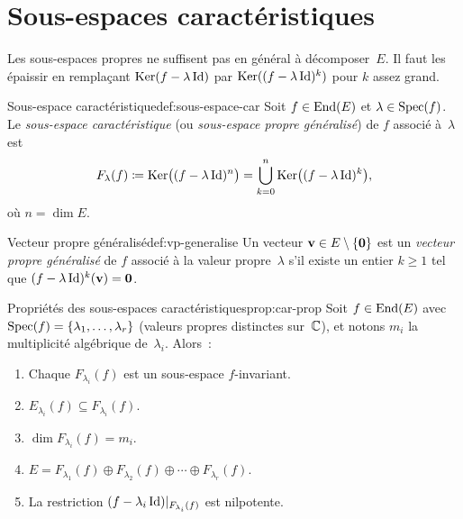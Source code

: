 \section{Sous-espaces caractéristiques}\label{sec:sous-espaces-car}

Les sous-espaces propres ne suffisent pas en général à décomposer~$E$.
Il faut les \og{}épaissir\fg{} en remplaçant $\operatorname{Ker}(f-\lambda\operatorname{Id})$ par
$\operatorname{Ker}((f-\lambda\operatorname{Id})^k)$ pour $k$ assez grand.

\begin{definition}{Sous-espace caractéristique}{def:sous-espace-car}
  Soit $f\in\operatorname{End}(E)$ et $\lambda\in\operatorname{Spec}(f)$. Le \emph{sous-espace
  caractéristique} (ou \emph{sous-espace
  propre généralisé}) de $f$
  associé à~$\lambda$ est
  \[
    F_\lambda(f)\coloneqq\operatorname{Ker}\bigl((f-\lambda\operatorname{Id})^n\bigr)
    =\bigcup_{k=0}^{n}\operatorname{Ker}\bigl((f-\lambda\operatorname{Id})^k\bigr),
  \]
  où $n=\dim E$.
\end{definition}

\begin{definition}{Vecteur propre généralisé}{def:vp-generalise}
  Un vecteur $\mathbf{v}\in E\setminus\left\{\mathbf{0}\right\}$ est un \emph{vecteur
  propre généralisé} de $f$ associé à la
  valeur propre~$\lambda$ s'il existe un entier $k\geq 1$ tel que
  $(f-\lambda\operatorname{Id})^k(\mathbf{v})=\mathbf{0}$.
\end{definition}

\begin{proposition}{Propriétés des sous-espaces caractéristiques}{prop:car-prop}
  Soit $f\in\operatorname{End}(E)$ avec $\operatorname{Spec}(f)=\left\{\lambda_1,\ldots,\lambda_r\right\}$
  (valeurs propres distinctes sur~${\mathbb{C}}$), et notons $m_i$ la multiplicité
  algébrique de~$\lambda_i$. Alors~:
  \begin{enumerate}[label=(\roman*)]
    \item\label{item:car-inv} Chaque $F_{\lambda_i}(f)$ est un
      sous-espace $f$-invariant.
    \item\label{item:car-contient} $E_{\lambda_i}(f)\subseteq F_{\lambda_i}(f)$.
    \item\label{item:car-dim} $\dim F_{\lambda_i}(f)=m_i$.
    \item\label{item:car-decomp} $E=F_{\lambda_1}(f)\oplus F_{\lambda_2}(f)
      \oplus\cdots\oplus F_{\lambda_r}(f)$.
    \item\label{item:car-nilp} La restriction
      $(f-\lambda_i\operatorname{Id})|_{F_{\lambda_i}(f)}$ est nilpotente.
  \end{enumerate}
\end{proposition}

